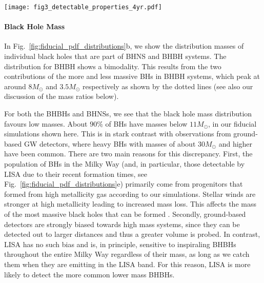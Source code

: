 \begin{figure*}[t]
    \centering
    \texttt{[image: fig3\_detectable\_properties\_4yr.pdf]}
    \caption{Properties of detectable systems for a 4-year LISA mission in our fiducial model. Each panel shows a kernel density estimator for a single property, coloured by DCO type. The shaded areas show the 1- and 2-$\sigma$ uncertainties (obtained via bootstrapping). The dotted lines in panel b show the individual primary and secondary mass distributions. The dotted line in panel e shows the star formation history we have assumed in our Milky Way model. See Sec.~\ref{sec:fiducial_distributions} for a discussion. \href{https://github.com/TomWagg/detecting-DCOs-in-LISA/blob/main/paper/figures/fig3_detectable_properties_4yr.pdf}{\faFileImage} \href{https://github.com/TomWagg/detecting-DCOs-in-LISA/blob/main/paper/figure_notebooks/fiducial.ipynb}{\faBook}.}
    \label{fig:fiducial_pdf_distributions}
\end{figure*}

\paragraph{Black Hole Mass}
In Fig.~\ref{fig:fiducial_pdf_distributions}b, we show the distribution masses of individual black holes that are part of BHNS and BHBH systems. 
The distribution for BHBH shows a bimodality. This results from the two contributions of the more and less massive BHs in BHBH systems, which peak at around $8 \unit{M_{\odot}}$ and $3.5 \unit{M_{\odot}}$ respectively as shown by the dotted lines (see also our discussion of the mass ratios below).

For both the BHBHs and BHNSs, we see that the black hole mass distribution favours low masses. About $90\%$ of BHs have masses below $11 \unit{M_{\odot}}$, in our fiducial simulations shown here. This is in stark contrast with observations from ground-based GW detectors, where heavy BHs with masses of about $30\unit{M_{\odot}}$ and higher have been common. There are two main reasons for this discrepancy. First, the population of BHs in the Milky Way (and, in particular, those detectable by LISA due to their recent formation times, see Fig.~\ref{fig:fiducial_pdf_distributions}e) primarily come from progenitors that formed from high metallicity gas according to our simulations. Stellar winds are stronger at high metallicity leading to increased mass loss. This affects the mass of the most massive black holes that can be formed \citep{Belczynski+2010}. Secondly, ground-based detectors are strongly biased towards high mass systems, since they can be detected out to larger distances and thus a greater volume is probed. In contrast, LISA has no such bias and is, in principle, sensitive to inspiraling BHBHs throughout the entire Milky Way regardless of their mass, as long as we catch them when they are emitting in the LISA band. For this reason, LISA is more likely to detect the more common lower mass BHBHs. 

